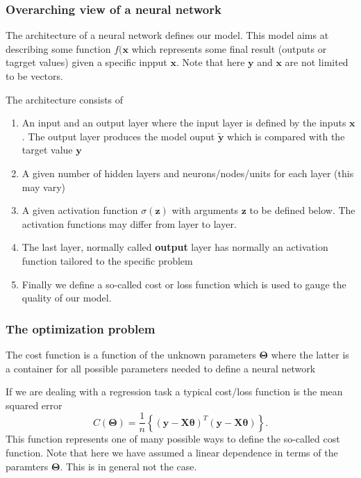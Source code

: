 \documentclass{beamer}
\begin{document}
\begin{frame}
\frametitle{Overarching view of a neural network}

The architecture of a neural network defines our model. This model
aims at describing some function $f(\bm{x}$ which represents
some final result (outputs or tagrget values) given a specific inpput
$\bm{x}$. Note that here $\bm{y}$ and $\bm{x}$ are not limited to be
vectors.

The architecture consists of
\begin{enumerate}
\item An input and an output layer where the input layer is defined by the inputs $\bm{x}$. The output layer produces the model ouput $\bm{\tilde{y}}$ which is compared with the target value $\bm{y}$

\item A given number of hidden layers and neurons/nodes/units for each layer (this may vary)

\item A given activation function $\sigma(\bm{z})$ with arguments $\bm{z}$ to be defined below. The activation functions may differ from layer to layer.

\item The last layer, normally called \textbf{output} layer has normally an activation function tailored to the specific problem

\item Finally we define a so-called cost or loss function which is used to gauge the quality of our model. 
\end{enumerate}

\noindent
\end{frame}

\begin{frame}
\frametitle{The optimization problem}

The cost function is a function of the unknown parameters
$\bm{\Theta}$ where the latter is a container for all possible
parameters needed to define a neural network

If we are dealing with a regression task a typical cost/loss function
is the mean squared error
\[
C(\bm{\Theta})=\frac{1}{n}\left\{\left(\bm{y}-\bm{X}\bm{\theta}\right)^T\left(\bm{y}-\bm{X}\bm{\theta}\right)\right\}.
\]
This function represents one of many possible ways to define
the so-called cost function. Note that here we have assumed a linear dependence in terms of the paramters $\bm{\Theta}$. This is in general not the case.
\end{frame}
\end{document}
